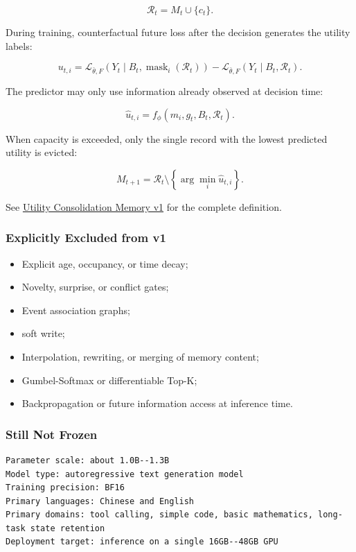 \[
\mathcal R_t=M_t\cup\{c_t\}.
\]

During training, counterfactual future loss after the decision generates the utility labels:

\[
u_{t,i} =
\mathcal L_{\bar\theta,F}
\left(Y_t\mid B_t,\operatorname{mask}_i(\mathcal R_t)\right) -
\mathcal L_{\bar\theta,F}
\left(Y_t\mid B_t,\mathcal R_t\right).
\]

The predictor may only use information already observed at decision time:

\[
\hat u_{t,i}=f_\phi(m_i,g_t,B_t,\mathcal R_t).
\]

When capacity is exceeded, only the single record with the lowest predicted utility is evicted:

\[
M_{t+1} =
\mathcal R_t\setminus
\left\{ \arg\min_i\hat u_{t,i}\right\}.
\]

See \href{utility-consolidation-memory-v1.md}{Utility Consolidation Memory v1} for the complete definition.

\subsubsection{Explicitly Excluded from v1}

\begin{itemize}
  \item Explicit age, occupancy, or time decay;
  \item Novelty, surprise, or conflict gates;
  \item Event association graphs;
  \item soft write;
  \item Interpolation, rewriting, or merging of memory content;
  \item Gumbel-Softmax or differentiable Top-K;
  \item Backpropagation or future information access at inference time.
\end{itemize}

\subsubsection{Still Not Frozen}

\begin{lstlisting}[style=notes]
Parameter scale: about 1.0B--1.3B
Model type: autoregressive text generation model
Training precision: BF16
Primary languages: Chinese and English
Primary domains: tool calling, simple code, basic mathematics, long-task state retention
Deployment target: inference on a single 16GB--48GB GPU
\end{lstlisting}

